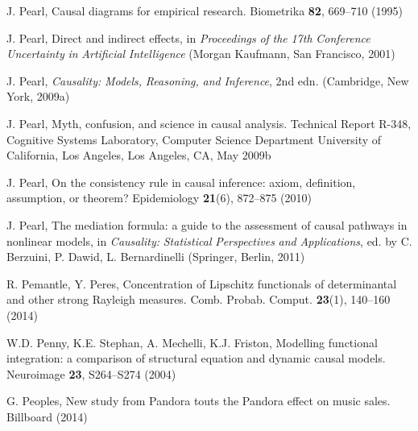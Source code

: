 \begin{list}{}{\setlength{\leftmargin}{2.1em}\setlength{\labelwidth}{0pt}
  \setlength{\labelsep}{0pt}\setlength{\itemindent}{-2.1em}
  \setlength{\parsep}{0pt}\setlength{\itemsep}{2pt}\setlength{\topsep}{0pt}}
\item\label{refentry:REF261}J. Pearl, Causal diagrams for empirical research. Biometrika \textbf{82}, 669--710 (1995)\label{refend:REF261}
\item\label{refentry:REF262}J. Pearl, Direct and indirect effects, in \textit{Proceedings} \textit{of} \textit{the} \textit{17th} \textit{Conference} \textit{Uncertainty} \textit{in} \textit{Artificial} \textit{Intelligence} (Morgan Kaufmann, San Francisco, 2001)\label{refend:REF262}
\item\label{refentry:REF263}J. Pearl, \textit{Causality:} \textit{Models,} \textit{Reasoning,} \textit{and} \textit{Inference}, 2nd edn. (Cambridge, New York, 2009a)\label{refend:REF263}
\item\label{refentry:REF264}J. Pearl, Myth, confusion, and science in causal analysis. Technical Report R-348, Cognitive Systems Laboratory, Computer Science Department University of California, Los Angeles, Los Angeles, CA, May 2009b\label{refend:REF264}
\item\label{refentry:REF265}J. Pearl, On the consistency rule in causal inference: axiom, definition, assumption, or theorem? Epidemiology \textbf{21}(6), 872--875 (2010)\label{refend:REF265}
\item\label{refentry:REF266}J. Pearl, The mediation formula: a guide to the assessment of causal pathways in nonlinear models, in \textit{Causality:} \textit{Statistical} \textit{Perspectives} \textit{and} \textit{Applications}, ed. by C. Berzuini, P. Dawid, L. Bernardinelli (Springer, Berlin, 2011)\label{refend:REF266}
\item\label{refentry:REF267}R. Pemantle, Y. Peres, Concentration of Lipschitz functionals of determinantal and other strong Rayleigh measures. Comb. Probab. Comput. \textbf{23}(1), 140--160 (2014)\label{refend:REF267}
\item\label{refentry:REF268}W.D. Penny, K.E. Stephan, A. Mechelli, K.J. Friston, Modelling functional integration: a comparison of structural equation and dynamic causal models. Neuroimage \textbf{23}, S264--S274 (2004)\label{refend:REF268}
\item\label{refentry:REF269}G. Peoples, New study from Pandora touts the Pandora effect on music sales. Billboard (2014)\label{refend:REF269}

\end{list}

